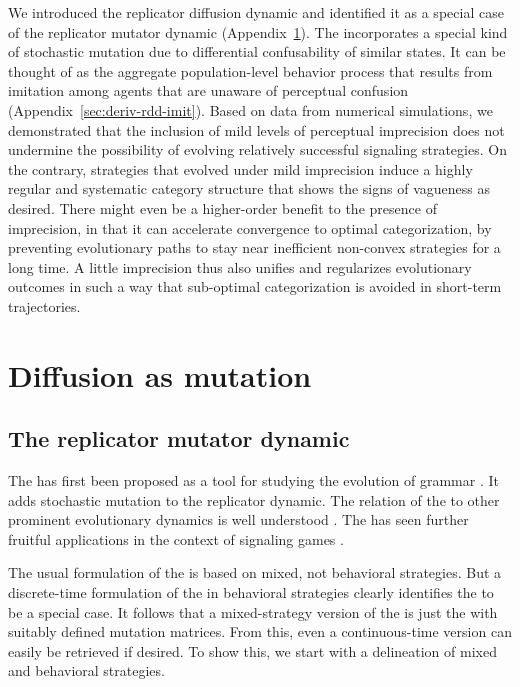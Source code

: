 \documentclass[fleqn,reqno,10pt]{article}
\newcommand{\rmd}{\acro{rmd}} %
\newcommand{\rdd}{\acro{rdd}} %
\begin{document}
We introduced the replicator diffusion dynamic and identified it as a special case of the
replicator mutator dynamic (Appendix~\ref{sec:diffusion-as-special}). The \rdd incorporates a
special kind of stochastic mutation due to differential confusability of similar states. It can
be thought of as the aggregate population-level behavior process that results from imitation
among agents that are unaware of perceptual confusion
(Appendix~\ref{sec:deriv-rdd-imit}). Based on data from numerical simulations, we demonstrated
that the inclusion of mild levels of perceptual imprecision does not undermine the possibility
of evolving relatively successful signaling strategies. On the contrary, strategies that
evolved under mild imprecision induce a highly regular and systematic category structure that
shows the signs of vagueness as desired. There might even be a higher-order benefit to the
presence of imprecision, in that it can accelerate convergence to optimal categorization, by
preventing evolutionary paths to stay near inefficient non-convex strategies for a long time. A
little imprecision thus also unifies and regularizes evolutionary outcomes in such a way that
sub-optimal categorization is avoided in short-term trajectories.



\appendix

\section{Diffusion as mutation}
\label{sec:diffusion-as-special}

\subsection{The replicator mutator dynamic}
\label{sec:repl-mutat-dynam}

The \rmd has first been proposed as a tool for studying the evolution
of grammar
\citep[e.g.][]{KomarovaNiyogi2001:The-Evolutionar,NowakKomarova2001:Evolution-of-Un}. It
adds stochastic mutation to the replicator dynamic. The relation of
the \rmd to other prominent evolutionary dynamics is well understood
\citep{PageNowak2002:Unifying-Evolut}. The \rmd has seen further
fruitful applications in the context of signaling games
\citep[e.g.][]{HutteggerSkyrms2010:Evolutionary-Dy}.

The usual formulation of the \rmd is based on mixed, not behavioral strategies. But a
discrete-time formulation of the \rmd in behavioral strategies clearly identifies the \rdd to
be a special case. It follows that a mixed-strategy version of the \rdd is just the \rmd with
suitably defined mutation matrices. From this, even a continuous-time version can easily be
retrieved if desired. To show this, we start with a delineation of mixed and behavioral
strategies.
\end{document}
